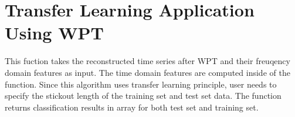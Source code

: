 \documentclass[letterpaper,10pt,english]{sphinxmanual}
\let\sphinxpxdimen\pdfpxdimen\else\newdimen\sphinxpxdimen
\begin{document}
\begin{fulllineitems}
\begin{quote}
\begin{description}
\begin{quote}
\begin{sphinxVerbatim}[commandchars=\\\{\}]
    
                                       
\PYGZbs{}\PYGZbs{}\PYGZbs{}
\end{sphinxVerbatim}
\end{quote}

\noindent\sphinxincludegraphics[width=600\sphinxpxdimen,height=360\sphinxpxdimen]{{example}.jpg}

\end{description}\end{quote}

\end{fulllineitems}

\label{\detokenize{WPT:module-WPT_Transfer_Learning}}

\section{Transfer Learning Application Using WPT}
\label{\detokenize{WPT:transfer-learning-application-using-wpt}}
This fuction takes the reconstructed time series after WPT and their freuqency 
domain features as input. The time domain features are computed inside of the 
function. Since this algorithm uses transfer learning principle, user needs to
specify the stickout length of the training set and test set data. The function 
returns classification results in array for both test set and training set.
\end{document}
